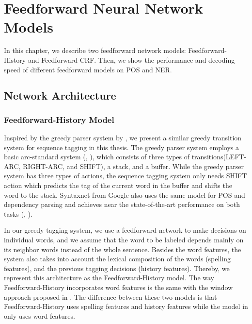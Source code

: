 
\chapter{Feedforward Neural Network Models}

In this chapter, we describe two feedforward network models: Feedforward-History and Feedforward-CRF. Then, we show the performance and decoding speed of different feedforward models on POS and NER. 

\section{Network Architecture}

\subsection{Feedforward-History Model}

Inspired by the greedy parser system by \cite{chen2014fast}, we present a similar greedy transition system for sequence tagging in this thesis. The greedy parser system employs a basic arc-standard system (\citeauthor{nivre2004deterministic}, \citeyear{nivre2004deterministic}), which consists of three types of transitions(LEFT-ARC, RIGHT-ARC, and SHIFT), a stack, and a buffer. While the greedy parser system has three types of actions, the sequence tagging system only needs SHIFT action which predicts the tag of the current word in the buffer and shifts the word to the stack.  Syntaxnet from Google also uses the same model for POS and dependency parsing and achieves near the state-of-the-art performance on both tasks (\citeauthor{alberti2017syntaxnet}, \citeyear{alberti2017syntaxnet}).

In our greedy tagging system, we use a feedforward network to make decisions on individual words, and we assume that the word to be labeled depends mainly on its neighbor words instead of the whole sentence. Besides the word features, the system also takes into account the lexical composition of the words (spelling features), and the previous tagging decisions (history features). Thereby, we represent this architecture as the Feedforward-History model. The way Feedforward-History incorporates word features is the same with the window approach proposed in \cite{collobert2011natural}. The difference between these two models is that Feedforward-History uses spelling features and history features while the model in \cite{collobert2011natural} only uses word features.

